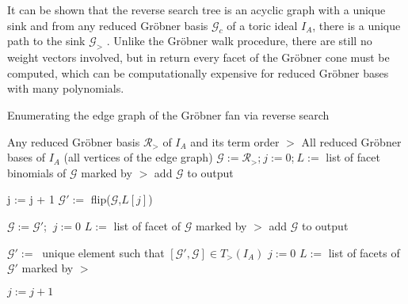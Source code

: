 \newpage

It can be shown that the reverse search tree is an acyclic graph with a unique sink and from any reduced Gröbner basis $\mathcal{G}_{c} $ of a toric ideal $I_{A}$, there is a unique path to the sink $\mathcal{G}_{>}$ \cite{tigers}.
Unlike the Gröbner walk procedure, there are still no weight vectors involved, but in return every facet of the Gröbner cone must be computed, which can be computationally expensive for reduced Gröbner bases with many polynomials.

\begin{algorithm}
\caption{Enumerating the edge graph of the Gröbner fan via reverse search \cite{tigers}}
\label{alg:reverse}
\begin{algorithmic}[1]

\Input
Any reduced Gröbner basis $ \mathcal{R}_{>} $ of $I_A$ and its term order $>$
\Output All reduced Gröbner bases of $I_A$ (all vertices of the edge graph)
\State $\mathcal{G} := \mathcal{R}_{>}$;$~j := 0$;$~L := $ list of facet binomials of $\mathcal{G}$ marked by $>$
\State add $\mathcal{G}$ to output
\Repeat
{}

\State j := j + 1
\State $\mathcal{G}':= $ flip($\mathcal{G}$,$L[j]$)

\State $\mathcal{G} := \mathcal{G}' $;   $~j := 0$
\State $ L := $ list of facet of $\mathcal{G}$ marked by $>$
\State add $ \mathcal{G}$ to output

\EndIf 

\EndWhile

\State $\mathcal{G}' :=~$ unique element such that $[\mathcal{G}',\mathcal{G}] \in T_{>}(I_{A}) $
\State $j := 0$
\State $L := $ list of facets of $\mathcal{G}'$ marked by $>$

\Repeat
\State $j := j + 1$

\EndIf



\end{algorithmic}
\end{algorithm}

\newpage

